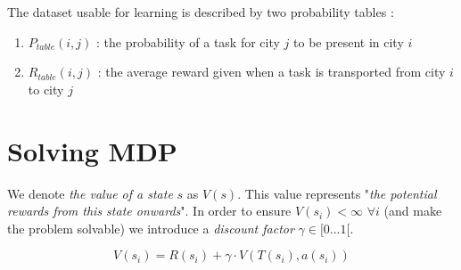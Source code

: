 \documentclass[11pt]{article}
\begin{document}
The dataset usable for learning is described by two probability tables :

\begin{enumerate}
    \item $P_{table}(i,j)$ : the probability of a task for city $j$ to be present in city $i$
    \item $R_{table}(i,j)$ : the average reward given when a task is transported from city $i$ to city $j$
\end{enumerate}

\section{Solving MDP}

We denote \textit{the value of a state} $s$ as $V(s)$. This value represents "\textit{the potential rewards from this state onwards}". In order to ensure $V(s_i) < \infty$ $\forall i$ (and make the problem solvable) we introduce a \textit{discount factor} $\gamma \in [0 ... 1 [$.

\[V(s_i) = R(s_i) + \gamma \cdot V(T(s_i),a(s_i))\]
\end{document}
